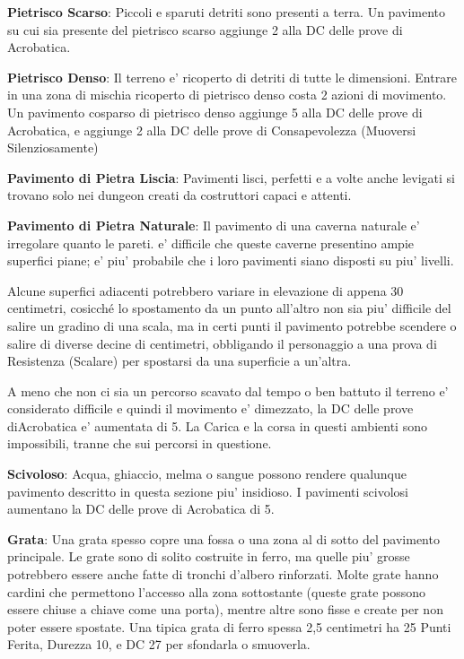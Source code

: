 \documentclass[a4paper,11pt,twoside,openany]{dndbook}
\begin{document}
\textbf{Pietrisco Scarso}: Piccoli e sparuti detriti sono presenti a terra. Un pavimento su cui sia presente del pietrisco scarso aggiunge 2 alla DC delle prove di Acrobatica.

\textbf{Pietrisco Denso}: Il terreno e' ricoperto di detriti di tutte le dimensioni. Entrare in una zona di mischia ricoperto di pietrisco denso costa 2 azioni di movimento. Un pavimento cosparso di pietrisco denso aggiunge 5 alla DC delle prove di Acrobatica, e aggiunge 2 alla DC delle prove di Consapevolezza (Muoversi Silenziosamente)

\textbf{Pavimento di Pietra Liscia}: Pavimenti lisci, perfetti e a volte anche levigati si trovano solo nei dungeon creati da costruttori capaci e attenti.

\textbf{Pavimento di Pietra Naturale}: Il pavimento di una caverna naturale e' irregolare quanto le pareti. e' difficile che queste caverne presentino ampie superfici piane; e' piu' probabile che i loro pavimenti siano disposti su piu' livelli. 

Alcune superfici adiacenti potrebbero variare in elevazione di appena 30 centimetri, cosicché lo spostamento da un punto all'altro non sia piu' difficile del salire un gradino di una scala, ma in certi punti il pavimento potrebbe scendere o salire di diverse decine di centimetri, obbligando il personaggio a una prova di Resistenza (Scalare) per spostarsi da una superficie a un'altra.

A meno che non ci sia un percorso scavato dal tempo o ben battuto il terreno e' considerato difficile e quindi il movimento e' dimezzato, la DC delle prove diAcrobatica e' aumentata di 5. La Carica e la corsa in questi ambienti sono impossibili, tranne che sui percorsi in questione.

\textbf{Scivoloso}: Acqua, ghiaccio, melma o sangue possono rendere qualunque pavimento descritto in questa sezione piu' insidioso. I pavimenti scivolosi aumentano la DC delle prove di Acrobatica di 5.

\textbf{Grata}: Una grata spesso copre una fossa o una zona al di sotto del pavimento principale. Le grate sono di solito costruite in ferro, ma quelle piu' grosse potrebbero essere anche fatte di tronchi d’albero rinforzati. Molte grate hanno cardini che permettono l’accesso alla zona sottostante (queste grate possono essere chiuse a chiave come una porta), mentre altre sono fisse e create per non poter essere spostate. Una tipica grata di ferro spessa 2,5 centimetri ha 25 Punti Ferita, Durezza 10, e DC 27 per sfondarla o smuoverla.
\end{document}

